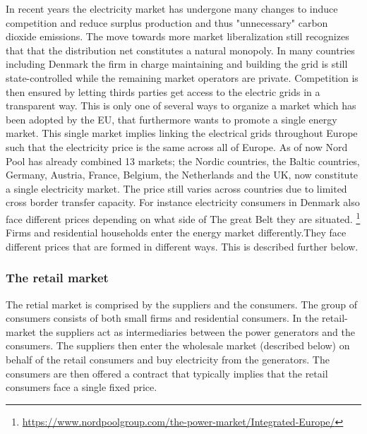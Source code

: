 In recent years the electricity market has undergone many changes to induce competition and reduce surplus production and thus "unnecessary" carbon dioxide emissions. The move towards more market liberalization still recognizes that that the distribution net constitutes a natural monopoly. In many countries including Denmark the firm in charge maintaining and building the grid is still state-controlled while the remaining market operators are private. Competition is then ensured by letting thirds parties get access to the electric grids in a transparent way. This is only one of several ways to organize a market which has been adopted by the EU, that furthermore wants to promote a single energy market. This single market  implies linking the electrical grids throughout Europe such that the electricity price is the same across all of Europe. As of now Nord Pool has already combined 13 markets; the Nordic countries, the Baltic countries, Germany, Austria, France, Belgium, the Netherlands and the UK, now constitute a single electricity market. The price still varies across countries due to limited cross border transfer capacity. For instance electricity consumers in Denmark also face different prices depending on what side of The great Belt they are situated. \footnote{\url{https://www.nordpoolgroup.com/the-power-market/Integrated-Europe/}} \smallskip \\

Firms and residential households enter the energy market differently.They face different prices that are formed in different ways. This is described further below.  

\subsubsection{The retail market} 
\label{subsubsec: t_resmarket}
The retial market is comprised by the suppliers and the consumers. The group of consumers consists of both small firms and residential consumers. In the retail-market the suppliers act as intermediaries between the power generators and the consumers. The suppliers then enter the wholesale market (described below) on behalf of the retail consumers and buy electricity from the generators. The consumers are then offered a contract that typically implies that the retail consumers face a single fixed price.\smallskip \\

